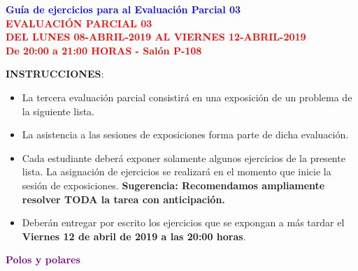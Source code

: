 \documentclass[12pt]{report}
\numberwithin{section}{chapter}
\begin{document}
\begin{center}
\textcolor{blue}{\textbf{\large Guía de ejercicios para al Evaluación Parcial 03}}\\
\vspace{0.5 cm}
\textcolor{red}{\textbf{\large EVALUACIÓN PARCIAL 03 \\ DEL LUNES 08-ABRIL-2019 AL VIERNES
12-ABRIL-2019\\ De 20:00 a 21:00 HORAS - Salón P-108}}
\end{center}

\textbf{INSTRUCCIONES}:
\begin{itemize}
\item La tercera evaluación parcial consistirá en una exposición de un problema de la siguiente lista.
\item La asistencia a las sesiones de exposiciones forma parte de dicha evaluación.
\item Cada estudiante deberá exponer solamente algunos ejercicios de la presente lista. La asignación de ejercicios se realizará en el momento que inicie la sesión de exposiciones. \textbf{Sugerencia: Recomendamos ampliamente resolver TODA la tarea con anticipación.}
\item Deberán entregar por escrito los ejercicios que se expongan a más tardar el \textbf{Viernes 12 de abril de 2019 a las 20:00 horas}.
\end{itemize}

\begin{center}
\textcolor{purple}{\textbf{\large Polos y polares}}
\end{center}
\end{document}
